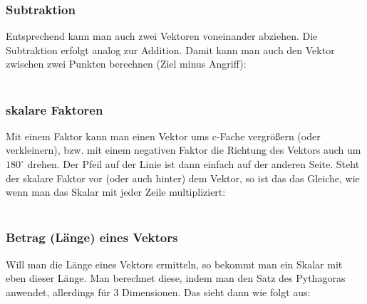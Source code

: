 	\subsubsection{Subtraktion}
		Entsprechend kann man auch zwei Vektoren voneinander abziehen. Die Subtraktion
		erfolgt analog zur Addition. Damit kann man auch den Vektor zwischen zwei
		Punkten berechnen (Ziel minus Angriff):
		\\ \\
		\formel{
			\[\vec{a}-\vec{b}=\begin{pmatrix}
			 a_1-b_1\\
			 a_2-b_2\\
			 a_3-b_3
			\end{pmatrix}\]
		}

	\subsubsection{skalare Faktoren}
		Mit einem Faktor kann man einen Vektor ums c-Fache vergrößern (oder
		verkleinern), bzw. mit einem negativen Faktor die Richtung des Vektors auch um
		\(180^{\circ}\) drehen. Der Pfeil auf der Linie ist dann einfach auf der
		anderen Seite. Steht der skalare Faktor vor (oder auch hinter) dem Vektor, so
		ist das das Gleiche, wie wenn man das Skalar mit jeder Zeile multipliziert:
		\\ \\
		\formel{
			\[c\cdot \vec{a}=
			\begin{pmatrix}
			 c\cdot a_1\\
			 c\cdot a_2\\
			 c\cdot a_3
			\end{pmatrix}
			\]
		}
	
	\subsubsection{Betrag (Länge) eines Vektors}
		Will man die Länge eines Vektors ermitteln, so bekommt man ein Skalar mit eben
		dieser Länge. Man berechnet diese, indem man den Satz des Pythagoras
		anwendet, allerdings für 3 Dimensionen. Das sieht dann wie folgt aus:
		\\ \\
		\formel{\[|\vec{a}|=\sqrt{a_1^2+a_2^2+a_3^2}\]}
	
